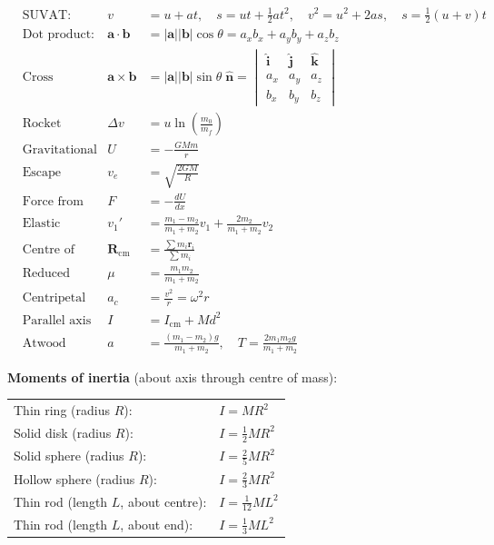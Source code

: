\begin{align*}
&\text{SUVAT:} & v &= u + at, \quad s = ut + \tfrac{1}{2}at^2, \quad v^2 = u^2 + 2as, \quad s = \tfrac{1}{2}(u+v)t \\[4pt]
&\text{Dot product:} & \mathbf{a}\cdot\mathbf{b} &= |\mathbf{a}||\mathbf{b}|\cos\theta = a_x b_x + a_y b_y + a_z b_z \\[4pt]
&\text{Cross product:} & \mathbf{a}\times\mathbf{b} &= |\mathbf{a}||\mathbf{b}|\sin\theta\;\hat{\mathbf{n}} = \begin{vmatrix}\hat{\mathbf{i}}&\hat{\mathbf{j}}&\hat{\mathbf{k}}\\a_x&a_y&a_z\\b_x&b_y&b_z\end{vmatrix} \\[4pt]
&\text{Rocket equation:} & \Delta v &= u \ln\!\left(\frac{m_0}{m_f}\right) \\[4pt]
&\text{Gravitational PE:} & U &= -\frac{GMm}{r} \\[4pt]
&\text{Escape velocity:} & v_e &= \sqrt{\frac{2GM}{R}} \\[4pt]
&\text{Force from PE:} & F &= -\frac{dU}{dx} \\[4pt]
&\text{Elastic collision (1D):} & v_1' &= \frac{m_1 - m_2}{m_1 + m_2}v_1 + \frac{2m_2}{m_1+m_2}v_2 \\[4pt]
&\text{Centre of mass:} & \mathbf{R}_\text{cm} &= \frac{\sum m_i\mathbf{r}_i}{\sum m_i} \\[4pt]
&\text{Reduced mass:} & \mu &= \frac{m_1 m_2}{m_1 + m_2} \\[4pt]
&\text{Centripetal accel:} & a_c &= \frac{v^2}{r} = \omega^2 r \\[4pt]
&\text{Parallel axis thm:} & I &= I_\text{cm} + Md^2 \\[4pt]
&\text{Atwood machine:} & a &= \frac{(m_1-m_2)g}{m_1+m_2}, \quad T = \frac{2m_1 m_2 g}{m_1+m_2}
\end{align*}

\noindent\textbf{Moments of inertia} (about axis through centre of mass):
\begin{center}
\begin{tabular}{ll}
Thin ring (radius $R$): & $I = MR^2$ \\
Solid disk (radius $R$): & $I = \tfrac{1}{2}MR^2$ \\
Solid sphere (radius $R$): & $I = \tfrac{2}{5}MR^2$ \\
Hollow sphere (radius $R$): & $I = \tfrac{2}{3}MR^2$ \\
Thin rod (length $L$, about centre): & $I = \tfrac{1}{12}ML^2$ \\
Thin rod (length $L$, about end): & $I = \tfrac{1}{3}ML^2$ \\
\end{tabular}
\end{center}

